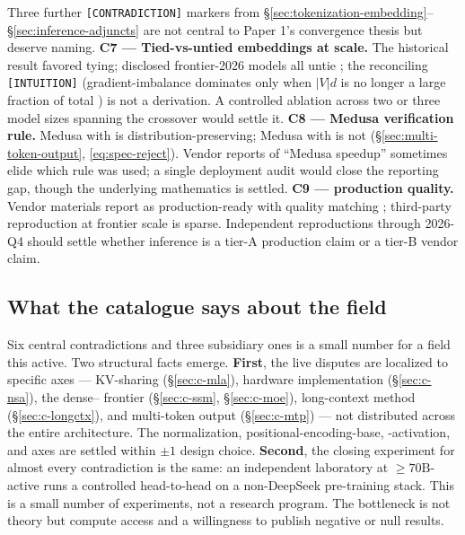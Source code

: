 Three further \texttt{[CONTRADICTION]} markers from
\S\ref{sec:tokenization-embedding}--\S\ref{sec:inference-adjuncts}
are not central to Paper 1's convergence thesis but deserve
naming. \textbf{C7 --- Tied-vs-untied embeddings at scale.} The
historical \citet{press2017-tied-embed} result favored tying;
disclosed frontier-2026 models all untie
\citep{meta-llama3, olmo2, deepseek-v3, qwen3}; the reconciling
\texttt{[INTUITION]} (gradient-imbalance dominates only when $|V| d$ is
no longer a large fraction of total ) is not a derivation. A
controlled ablation across two or three model sizes spanning the
crossover would settle it. \textbf{C8 --- Medusa verification rule.}
Medusa with  is distribution-preserving; Medusa with
 is not (\S\ref{sec:multi-token-output},
\cref{eq:spec-reject}). Vendor reports of ``Medusa speedup''
sometimes elide which rule was used; a single deployment audit would
close the reporting gap, though the underlying mathematics is settled.
\textbf{C9 ---  production quality.} Vendor materials report
 as production-ready with quality matching ; third-party
reproduction at frontier scale is sparse. Independent reproductions
through 2026-Q4 should settle whether  inference is a tier-A
production claim or a tier-B vendor claim.

\subsection{What the catalogue says about the field}
\label{sec:c-meta}

Six central contradictions and three subsidiary ones is a small
number for a field this active. Two structural facts emerge.
\textbf{First}, the live disputes are localized to specific axes ---
KV-sharing (\S\ref{sec:c-mla}), hardware implementation
(\S\ref{sec:c-nsa}), the dense-- frontier
(\S\ref{sec:c-ssm}, \S\ref{sec:c-moe}), long-context method
(\S\ref{sec:c-longctx}), and multi-token output
(\S\ref{sec:c-mtp}) --- not distributed across the entire architecture.
The normalization, positional-encoding-base, -activation, and
 axes are settled within $\pm 1$ design choice.
\textbf{Second}, the closing experiment for almost every contradiction
is the same: an independent laboratory at $\geq 70\mathrm{B}$-active
runs a controlled head-to-head on a non-DeepSeek pre-training stack.
This is a small number of experiments, not a research program. The
bottleneck is not theory but compute access and a willingness to
publish negative or null results.

